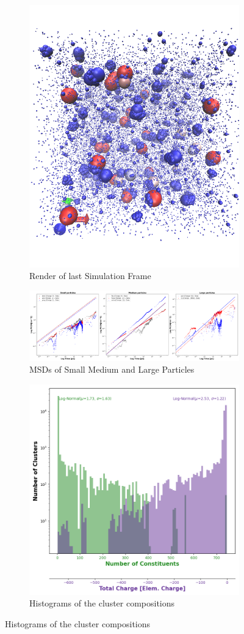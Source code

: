 \documentclass[draft, english]{volcanica-template}
\begin{document}
\begin{figure}[!htbp]
\centering
\begin{figure}[!htbp]
\centering
\includegraphics[width=0.7\linewidth]{files/ChargeRender-3dbdd7b54096fb809c2acff9c9619e44.png}
\caption[]{Render of last Simulation Frame}
\label{Fig9_IntCytoSys}
\end{figure}

\begin{figure}[!htbp]
\centering
\includegraphics[width=0.7\linewidth]{files/Combined_MSD-f9d4672aec0b2f71b5b6b265ddbd2c1a.png}
\caption[]{MSDs of Small Medium and Large Particles}
\label{Fig9_IntCytoSys-b}
\end{figure}

\begin{figure}[!htbp]
\centering
\includegraphics[width=0.7\linewidth]{files/Cluster_Histogram_Fi-c986668020a4bec3825e3c996ce5c400.png}
\caption[]{Histograms of the cluster compositions}
\label{Fig9_IntCytoSys-c}
\end{figure}


\end{figure}
\end{document}
